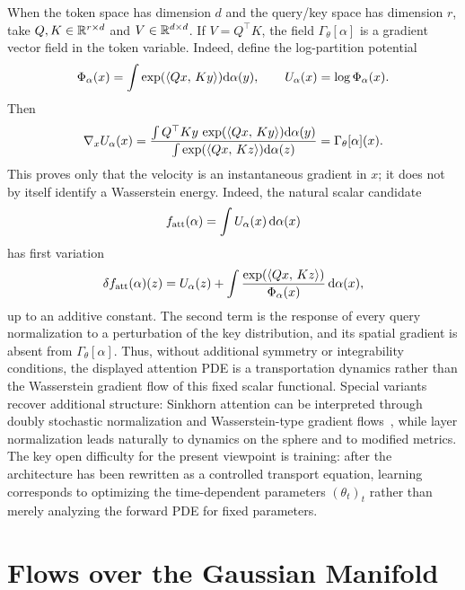 When the token space has dimension $d$ and the query/key space has dimension $r$, take $Q,K\in\mathbb{R}^{r\times d}$ and $V\in\mathbb{R}^{d\times d}$. If $V=Q^\top K$, the field $\Gamma_\theta[\alpha]$ is a gradient vector field in the token variable. Indeed, define the log-partition potential
\[
	\Phi_\alpha(x)
	=
	\int \exp(\langle Qx,\,Ky\rangle)\mathrm{d}\alpha(y),
	\qquad
	U_\alpha(x)=\log\Phi_\alpha(x).
\]
Then
\[
	\nabla_x U_\alpha(x)
	=
	\frac{\int Q^\top K y\,\exp(\langle Qx,\,Ky\rangle)\mathrm{d}\alpha(y)}
	     {\int \exp(\langle Qx,\,Kz\rangle)\mathrm{d}\alpha(z)}
	=
	\Gamma_\theta[\alpha](x).
\]
This proves only that the velocity is an instantaneous gradient in $x$; it does not by itself identify a Wasserstein energy. Indeed, the natural scalar candidate
\[
	f_{\rm att}(\alpha)=\int U_\alpha(x)\,\mathrm{d}\alpha(x)
\]
has first variation
\[
	\delta f_{\rm att}(\alpha)(z)
	=
	U_\alpha(z)
	+
	\int
	\frac{\exp(\langle Qx,\,Kz\rangle)}{\Phi_\alpha(x)}
	\,\mathrm{d}\alpha(x),
\]
up to an additive constant. The second term is the response of every query normalization to a perturbation of the key distribution, and its spatial gradient is absent from $\Gamma_\theta[\alpha]$. Thus, without additional symmetry or integrability conditions, the displayed attention PDE is a transportation dynamics rather than the Wasserstein gradient flow of this fixed scalar functional. Special variants recover additional structure: Sinkhorn attention can be interpreted through doubly stochastic normalization and Wasserstein-type gradient flows~\cite{Sander2022Sinkformers,Castin2025DynamicsTransformers}, while layer normalization leads naturally to dynamics on the sphere and to modified metrics. The key open difficulty for the present viewpoint is training: after the architecture has been rewritten as a controlled transport equation, learning corresponds to optimizing the time-dependent parameters $(\theta_t)_t$ rather than merely analyzing the forward PDE for fixed parameters.

\section{Flows over the Gaussian Manifold}
\label{sec-gaussian-closure-transport-dynamics}

